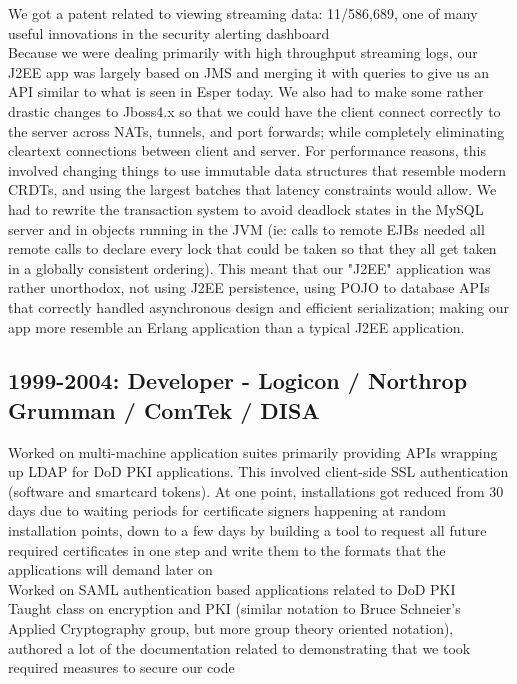 \documentclass[margin]{res}
\begin{document}
\begin{resume}
We got a patent related to viewing streaming data: 11/586,689, one
of many useful innovations in the security alerting dashboard \\
Because we were dealing primarily with high throughput streaming logs,
our J2EE app was largely based on JMS and merging it with queries to
give us an API similar to what is seen in Esper today.  
We also had to make some rather drastic changes to Jboss4.x so that we could
have the client connect correctly to the server across NATs, tunnels, and port forwards; while completely eliminating cleartext connections between client and server.  For performance reasons, this involved changing things to use immutable data structures that resemble modern CRDTs, and using the largest batches that latency constraints would allow.  We had to rewrite the transaction system
to avoid deadlock states in the MySQL server and in objects running in
the JVM (ie: calls to remote EJBs needed all remote calls to declare every lock that could be taken so that they all get taken in a globally consistent ordering).   This meant that our "J2EE" application was rather unorthodox,
not using J2EE persistence, using POJO to database APIs that correctly handled asynchronous design and efficient serialization; making our app more resemble an Erlang application than a typical J2EE application.

\subsection{1999-2004: Developer - Logicon / Northrop Grumman / ComTek / DISA}
Worked on multi-machine application suites primarily providing APIs
wrapping up LDAP for DoD PKI applications.  This involved client-side
SSL authentication (software and smartcard tokens).  
At one point, installations got reduced from 30 days due to waiting periods
for certificate signers happening at random installation points, down to
a few days by building a tool to request all future required certificates in one step and write them to the formats that the applications will demand later on \\
Worked on SAML authentication based applications related to DoD PKI \\
Taught class on encryption and PKI (similar notation to Bruce Schneier's Applied Cryptography group, but more group theory oriented notation), authored a lot of the documentation related to demonstrating that we took required measures to secure our code \\


\end{resume}
\end{document}
